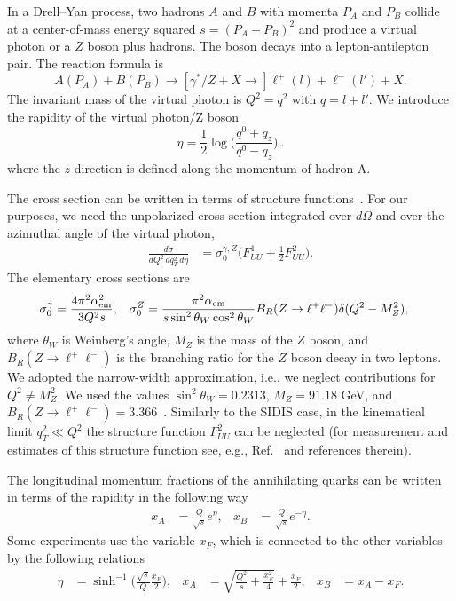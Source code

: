 \documentclass[aps,preprintnumbers,showpacs,nofootinbib,superscriptaddress,floatfix]{revtex4}
\newcommand{\AS}[1]{{\textcolor[rgb]{1,0,1}{#1}}}
\begin{document}
In a Drell--Yan process, two hadrons $A$ and $B$ with momenta $P_A$ and $P_B$
collide at a center-of-mass energy squared $s = (P_A + P_B)^2$ 
and produce a virtual photon or a $Z$ boson plus hadrons. 
The boson decays into a
lepton-antilepton pair. The reaction formula is
\begin{equation}
A(P_A)+B(P_B)\to [\gamma^*/Z + X \to] \ell^+(l) + \ell^-(l') + X.
\end{equation} 
The invariant mass of the virtual photon is $Q^2=q^2$ with $q = l + l'$. 
We introduce the rapidity of the virtual photon/Z boson
\begin{equation}
\eta=\frac{1}{2}\log\bigg(\frac{q^0+q_z}{q^0-q_z}\bigg)\  .
\end{equation} 
where the $z$ direction is defined along the momentum of hadron A.

The cross section can be written in terms of structure
functions~\cite{Boer:2006eq,Arnold:2008kf}. For our purposes, we need the unpolarized 
cross section
integrated over $d\Omega$ and over the azimuthal angle of the virtual photon, 
\begin{align}
\label{e:dsigma_gZ}
\frac{d\sigma}{dQ^2\, dq_T^2\,d\eta} &= \sigma_0^{\gamma,Z}
\bigg(F_{UU}^1 + \frac{1}{2} F_{UU}^2\bigg). 
\end{align} 
The elementary cross sections are
\begin{align}
\sigma_0^{\gamma} &= \frac{4\pi^2 \alpha^2_{\rm em}}{3 Q^2 s},
&
\sigma_0^Z &= 
\frac{\pi^2 \alpha_{\rm em}}{s \sin^2{\theta_W} \cos^2{\theta_W}}
B_R(Z\rightarrow \ell^+\ell^-)
\delta(Q^2 - M_Z^2), 
\label{e:elem_cs_sig0}
\end{align} 
where $\theta_W$ is Weinberg's angle, $M_Z$ is the mass of the $Z$ boson, and
\AS{$B_R(Z\rightarrow \ell^+\ell^-)$} is the branching ratio for the $Z$ boson decay in two leptons.
We adopted the narrow-width approximation, i.e., we neglect contributions for 
$Q^2 \neq M_Z^2$. 
We used the values 
$\sin^2 \theta_W= 0.2313$, $M_Z = 91.18$ GeV, and 
$B_R(Z\rightarrow \ell^+\ell^-)=3.366$\AS{~\cite{Olive:2016xmw}}.  
Similarly to the SIDIS case, in the kinematical limit $q_T^2 \ll Q^2$ 
the structure function $F_{UU}^2$ can be neglected 
(for measurement and estimates of this
structure function see, e.g.,
Ref.~\cite{Lambertsen:2016wgj} and references therein). 

The longitudinal momentum fractions \AS{of the annihilating quarks} can be written in terms of the 
rapidity in the following way 
\begin{align}
x_A &= \frac{Q}{\sqrt{s}} e^{\eta},
&
x_B &= \frac{Q}{\sqrt{s}} e^{-\eta}.
\label{xab}
\end{align} 
Some experiments use the variable $x_F$, which is connected to the other
variables  by the following relations
\begin{align}
\label{e:eta_xf}
\eta &= \sinh^{-1}\bigg(\frac{\sqrt{s}}{Q}\frac{x_F}{2}\bigg),
& 
x_{A} &= \sqrt{\frac{Q^2}{s} + \frac{x_F^2}{4}} + \frac{x_F}{2},
&
x_B &= x_A - x_F.  
\end{align} 
\end{document}
